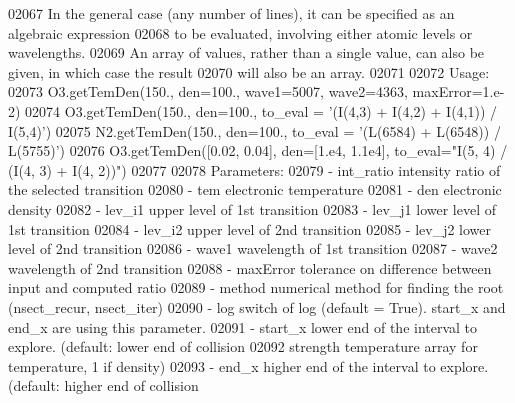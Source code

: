 \begin{DoxyCode}
{{02067 \textcolor{stringliteral}{        In the general case (any number of lines), it can be specified as an algebraic expression }
02068 \textcolor{stringliteral}{            to be evaluated, involving either atomic levels or wavelengths.}
02069 \textcolor{stringliteral}{        An array of values, rather than a single value, can also be given, in which case the result }
02070 \textcolor{stringliteral}{            will also be an array.}
02071 \textcolor{stringliteral}{            }
02072 \textcolor{stringliteral}{        Usage: }
02073 \textcolor{stringliteral}{            O3.getTemDen(150., den=100., wave1=5007, wave2=4363, maxError=1.e-2)}
02074 \textcolor{stringliteral}{            O3.getTemDen(150., den=100., to\_eval = '(I(4,3) + I(4,2) + I(4,1)) / I(5,4)')}
02075 \textcolor{stringliteral}{            N2.getTemDen(150., den=100., to\_eval = '(L(6584) + L(6548)) / L(5755)')}
02076 \textcolor{stringliteral}{            O3.getTemDen([0.02, 0.04], den=[1.e4, 1.1e4], to\_eval="I(5, 4) / (I(4, 3) + I(4, 2))")}
02077 \textcolor{stringliteral}{}
02078 \textcolor{stringliteral}{        Parameters:}
02079 \textcolor{stringliteral}{            - int\_ratio    intensity ratio of the selected transition}
02080 \textcolor{stringliteral}{            - tem          electronic temperature}
02081 \textcolor{stringliteral}{            - den          electronic density}
02082 \textcolor{stringliteral}{            - lev\_i1       upper level of 1st transition}
02083 \textcolor{stringliteral}{            - lev\_j1       lower level of 1st transition}
02084 \textcolor{stringliteral}{            - lev\_i2       upper level of 2nd transition}
02085 \textcolor{stringliteral}{            - lev\_j2       lower level of 2nd transition}
02086 \textcolor{stringliteral}{            - wave1        wavelength of 1st transition}
02087 \textcolor{stringliteral}{            - wave2        wavelength of 2nd transition}
02088 \textcolor{stringliteral}{            - maxError     tolerance on difference between input and computed ratio }
02089 \textcolor{stringliteral}{            - method       numerical method for finding the root (nsect\_recur, nsect\_iter)}
02090 \textcolor{stringliteral}{            - log          switch of log (default = True). start\_x and end\_x are using this parameter.}
02091 \textcolor{stringliteral}{            - start\_x      lower end of the interval to explore. (default: lower end of collision }
02092 \textcolor{stringliteral}{                            strength temperature array for temperature, 1 if density)}
02093 \textcolor{stringliteral}{            - end\_x        higher end of the interval to explore. (default: higher end of collision }
}}
\end{DoxyCode}
